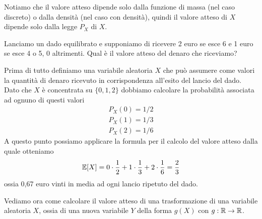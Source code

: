 Notiamo che il valore atteso dipende solo dalla funzione di massa (nel caso discreto) o dalla
densità (nel caso con densità), quindi il valore atteso di $X$ dipende solo dalla legge $P_X$
di $X$.

\begin{example}
	Lanciamo un dado equilibrato e supponiamo di ricevere 2 euro se esce 6 e 1 euro se esce 4 o 5,
	0 altrimenti. Qual è il valore atteso del denaro che riceviamo?

	Prima di tutto definiamo una variabile aleatoria $X$ che può assumere come valori la quantità
	di denaro ricevuto in corrispondenza all'esito del lancio del dado. Dato che $X$ è concentrata
	su $\{ 0, 1, 2 \}$ dobbiamo calcolare la probabilità associata ad ognuno di questi valori
	\begin{gather*}
		P_X(0) = 1 / 2 \\[1ex]
		P_X(1) = 1 / 3 \\[1ex]
		P_X(2) = 1 / 6
	\end{gather*}
	A questo punto possiamo applicare la formula per il calcolo del valore atteso dalla quale
	otteniamo
	\[ \mathbb{E}[X] = 0 \cdot \frac{1}{2} + 1 \cdot \frac{1}{3} + 2 \cdot \frac{1}{6} = \frac{2}{3} \]
	ossia 0,67 euro vinti in media ad ogni lancio ripetuto del dado.
\end{example}

Vediamo ora come calcolare il valore atteso di una trasformazione di una variabile aleatoria $X$,
ossia di una nuova variabile $Y$ della forma $g(X)$ con $g : \mathbb{R} \to \mathbb{R}$.

